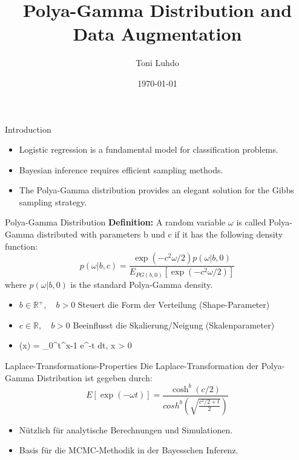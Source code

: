 \documentclass{beamer}
\title{Polya-Gamma Distribution and Data Augmentation}
\author{Toni Luhdo}
\date{\today}
\begin{document}
	
	\frame{\titlepage}
	
	\begin{frame}{Introduction}
		\begin{itemize}
			\item Logistic regression is a fundamental model for classification problems.
			\item Bayesian inference requires efficient sampling methods.
			\item The Polya-Gamma distribution provides an elegant solution for the Gibbs sampling strategy.
		\end{itemize}
	\end{frame}
	
	\begin{frame}{Polya-Gamma Distribution}
		\textbf{Definition:} A random variable $\omega$ is called Polya-Gamma distributed with parameters b und c if it has the following density function:
		\begin{equation}
			p(\omega | b, c) = \frac{\exp(-c^2 \omega /2) p(\omega | b, 0)}{E_{PG(b,0)}[\exp(-c^2 \omega /2)]}
		\end{equation}
		where $p(\omega | b, 0)$ is the standard Polya-Gamma density.
		\begin{itemize}
			\item $b \in \mathbb{R}^{+}, \quad b > 0$ Steuert die Form der Verteilung (Shape-Parameter)
			\item $c \in \mathbb{R}, \quad b > 0$ Beeinflusst die Skalierung/Neigung (Skalenparameter)
			\item  \Gamma(x) = \int_0^\infty t^{x-1} e^{-t} dt, \quad {} x > 0
		\end{itemize}
		\end{frame}
	
	\begin{frame}{Laplace-Transformations-Properties}
		Die Laplace-Transformation der Polya-Gamma Distribution ist gegeben durch:
		\begin{equation}
			E[\exp(-\omega t)] =\frac{ \cosh^{b}(c/2)}{cosh^{b}(\sqrt{\frac{c^2/2+t}{2}})}
		\end{equation}
		\begin{itemize}
			\item Nützlich für analytische Berechnungen und Simulationen.
			\item Basis für die MCMC-Methodik in der Bayesschen Inferenz.
		\end{itemize}
	\end{frame}
\end{document}
